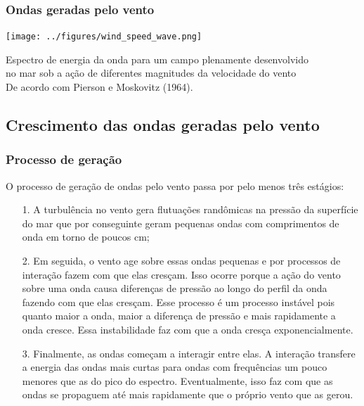 \begin{frame}
\frametitle{Ondas geradas pelo vento}
  \begin{center}
    \texttt{[image: ../figures/wind\_speed\_wave.png]}
  \end{center}
  \tiny{Espectro de energia da onda para um campo plenamente desenvolvido\\
        no mar sob a ação de diferentes magnitudes da velocidade do vento\\
        De acordo com Pierson e Moskovitz (1964).}
\end{frame}


\subsection{Crescimento das ondas geradas pelo vento}
\begin{frame}
\frametitle{Processo de geração}
  {\small O processo de geração de ondas pelo vento passa por pelo menos três}
          estágios:
  {\scriptsize
  \begin{itemize}[<+-| alert@+>]
    \item[1.] A turbulência no vento gera flutuações randômicas na pressão da
              superfície do mar que por conseguinte geram pequenas ondas com
              comprimentos de onda em torno de poucos cm;
    \item[2.] Em seguida, o vento age sobre essas ondas pequenas e por
              processos de interação fazem com que elas cresçam. Isso ocorre
              porque a ação do vento sobre uma onda causa diferenças de pressão
              ao longo do perfil da onda fazendo com que elas cresçam. Esse
              processo é um processo instável pois quanto maior a onda, maior a diferença de pressão e mais rapidamente a onda cresce. Essa instabilidade faz com que a onda cresça exponencialmente.
    \item[3.] Finalmente, as ondas começam a interagir entre elas. A interação
              transfere a energia das ondas mais curtas para ondas com
              frequências um pouco menores que as do pico do espectro.
              Eventualmente, isso faz com que as ondas se propaguem até mais
              rapidamente que o próprio vento que as gerou.
  \end{itemize}
  }
\end{frame}


